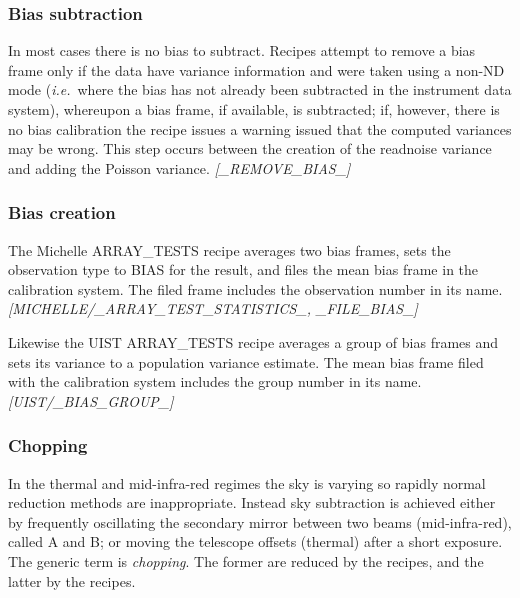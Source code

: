 \documentclass[twoside,11pt,nolof]{starlink}
\begin{document}
\subsubsection{Bias subtraction\label{bias_subtraction}}

In most cases there is no bias to subtract.  Recipes attempt to remove
a bias frame only if the data have variance information and were taken
using a non-ND mode (\emph{{i.e.}}\ where the bias has not already been
subtracted in the instrument data system), whereupon a bias frame, if
available, is subtracted; if, however, there is no bias calibration
the recipe issues a warning issued that the computed variances may be
wrong.  This step occurs between the creation of the readnoise
variance and adding the Poisson variance.
\newline \emph{[\_REMOVE\_BIAS\_]}

\subsubsection{Bias creation\label{bias_creation}}

The Michelle ARRAY\_TESTS recipe averages two bias frames, sets the
observation type to BIAS for the result, and files the mean bias frame
in the calibration system.  The filed frame includes the observation
number in its name.
\newline \emph{[MICHELLE/\_ARRAY\_TEST\_STATISTICS\_, \_FILE\_BIAS\_]}

Likewise the UIST ARRAY\_TESTS recipe averages a group of bias frames
and sets its variance to a population variance estimate.  The mean
bias frame filed with the calibration system includes the group number
in its name.
\newline \emph{[UIST/\_BIAS\_GROUP\_]}

\subsubsection{Chopping\label{chopping}}

In the thermal and mid-infra-red regimes the sky is varying so rapidly
normal reduction methods are inappropriate.  Instead sky subtraction
is achieved either by frequently oscillating the secondary mirror
between two beams (mid-infra-red), called A and B; or moving the
telescope offsets (thermal) after a short exposure.  The generic term
is \emph{chopping}.  The former are reduced by the
 recipes, and the latter by the
 recipes.
\end{document}
